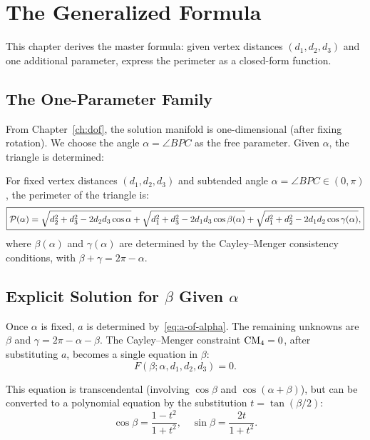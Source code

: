 \chapter{The Generalized Formula}
\label{ch:generalized}

This chapter derives the master formula: given vertex distances $(d_1, d_2, d_3)$ and one additional parameter, express the perimeter as a closed-form function.

\section{The One-Parameter Family}

From Chapter~\ref{ch:dof}, the solution manifold is one-dimensional (after fixing rotation). We choose the angle $\alpha = \angle BPC$ as the free parameter. Given $\alpha$, the triangle is determined:

\begin{theorem}
\label{thm:generalized}
For fixed vertex distances $(d_1, d_2, d_3)$ and subtended angle $\alpha = \angle BPC \in (0, \pi)$, the perimeter of the triangle is:
\begin{equation}
\label{eq:generalized-perimeter}
\boxed{\mathcal{P}(\alpha) = \sqrt{d_2^2 + d_3^2 - 2d_2 d_3\cos\alpha} + \sqrt{d_1^2 + d_3^2 - 2d_1 d_3\cos\beta(\alpha)} + \sqrt{d_1^2 + d_2^2 - 2d_1 d_2\cos\gamma(\alpha)},}
\end{equation}
where $\beta(\alpha)$ and $\gamma(\alpha)$ are determined by the Cayley--Menger consistency conditions, with $\beta + \gamma = 2\pi - \alpha$.
\end{theorem}

\section{Explicit Solution for $\beta$ Given $\alpha$}

Once $\alpha$ is fixed, $a$ is determined by~\eqref{eq:a-of-alpha}. The remaining unknowns are $\beta$ and $\gamma = 2\pi - \alpha - \beta$. The Cayley--Menger constraint $\mathrm{CM}_4 = 0$, after substituting $a$, becomes a single equation in $\beta$:
\begin{equation}
\label{eq:beta-equation}
F(\beta; \alpha, d_1, d_2, d_3) = 0.
\end{equation}

This equation is transcendental (involving $\cos\beta$ and $\cos(\alpha + \beta)$), but can be converted to a polynomial equation by the substitution $t = \tan(\beta/2)$:
\begin{equation}
\cos\beta = \frac{1 - t^2}{1 + t^2}, \quad \sin\beta = \frac{2t}{1 + t^2}.
\end{equation}

